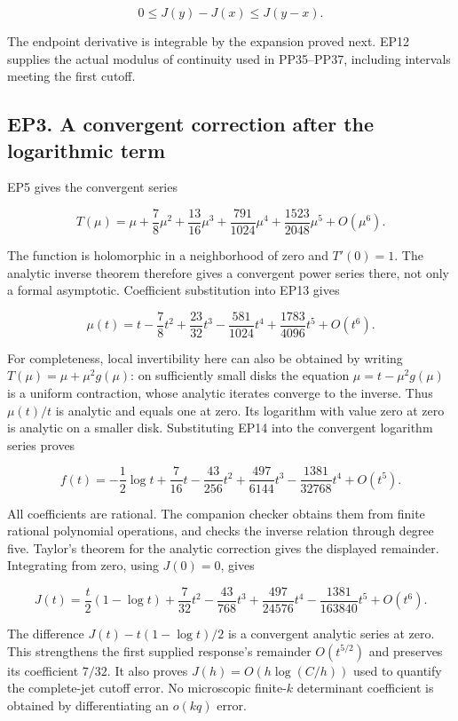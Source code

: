 \documentclass[10pt]{article}
\begin{document}
\[
 0\le J(y)-J(x)\le J(y-x).
 \tag{EP12}
\]

The endpoint derivative is integrable by the expansion proved next. EP12 supplies the actual modulus of continuity used in PP35--PP37, including intervals meeting the first cutoff.

\subsection{EP3. A convergent correction after the logarithmic term}\label{ep3.-a-convergent-correction-after-the-logarithmic-term}

EP5 gives the convergent series

\[
 T(\mu)=\mu+\frac78\mu^2+\frac{13}{16}\mu^3
 +\frac{791}{1024}\mu^4+\frac{1523}{2048}\mu^5+O(\mu^6).
 \tag{EP13}
\]

The function is holomorphic in a neighborhood of zero and \(T'(0)=1\). The analytic inverse theorem therefore gives a convergent power series there, not only a formal asymptotic. Coefficient substitution into EP13 gives

\[
 \mu(t)=t-\frac78t^2+\frac{23}{32}t^3
 -\frac{581}{1024}t^4+\frac{1783}{4096}t^5+O(t^6).
 \tag{EP14}
\]

For completeness, local invertibility here can also be obtained by writing \(T(\mu)=\mu+\mu^2g(\mu)\): on sufficiently small disks the equation \(\mu=t-\mu^2g(\mu)\) is a uniform contraction, whose analytic iterates converge to the inverse. Thus \(\mu(t)/t\) is analytic and equals one at zero. Its logarithm with value zero at zero is analytic on a smaller disk. Substituting EP14 into the convergent logarithm series proves

\[
 f(t)=-\frac12\log t+\frac7{16}t-\frac{43}{256}t^2
 +\frac{497}{6144}t^3-\frac{1381}{32768}t^4+O(t^5).
 \tag{EP15}
\]

All coefficients are rational. The companion checker obtains them from finite rational polynomial operations, and checks the inverse relation through degree five. Taylor's theorem for the analytic correction gives the displayed remainder. Integrating from zero, using \(J(0)=0\), gives

\[
 \boxed{J(t)=\frac t2(1-\log t)+\frac7{32}t^2-\frac{43}{768}t^3
 +\frac{497}{24576}t^4-\frac{1381}{163840}t^5+O(t^6).}
 \tag{EP16}
\]

The difference \(J(t)-t(1-\log t)/2\) is a convergent analytic series at zero. This strengthens the first supplied response's remainder \(O(t^{5/2})\) and preserves its coefficient \(7/32\). It also proves \(J(h)=O(h\log(C/h))\) used to quantify the complete-jet cutoff error. No microscopic finite-\(k\) determinant coefficient is obtained by differentiating an \(o(kq)\) error.
\end{document}
